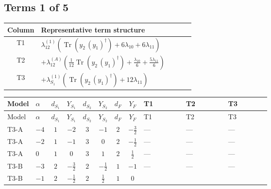 \documentclass[8pt]{article}
\begin{document}
\begin{landscape}
\subsection*{Terms 1 of 5}
\begin{center}
\begin{tabular}{@{}c >{\raggedright\arraybackslash}p{0.82\linewidth}@{}}
\toprule
Column & Representative term structure \\
\midrule
T1 & \(\displaystyle {\lambda_{12}^{(1)}} (\operatorname{Tr}\!\left({y_2}\,\left({y_1}\right)^{\dagger}\right)+6 {\lambda_{10}}+6 {\lambda_{11}})\) \\
\midrule
T2 & \(\displaystyle +{\lambda_{12}^{(A)}} \left(\frac{1}{12} \operatorname{Tr}\!\left({y_2}\,\left({y_1}\right)^{\dagger}\right)+\frac{{\lambda_{10}}}{6}+\frac{5 {\lambda_{11}}}{6}\right)\) \\
\midrule
T3 & \(\displaystyle +{\lambda_{S_1}^{(1)}} (\operatorname{Tr}\!\left({y_2}\,\left({y_1}\right)^{\dagger}\right)+12 {\lambda_{11}})\) \\
\midrule
\bottomrule
\end{tabular}
\end{center}
\smallskip
\tiny
\begin{longtable}{@{}llcccccc >{\raggedright\arraybackslash}p{0.21\linewidth} >{\raggedright\arraybackslash}p{0.21\linewidth} >{\raggedright\arraybackslash}p{0.21\linewidth}@{}}
\toprule
Model & $\alpha$ & $d_{S_1}$ & $Y_{S_1}$ & $d_{S_2}$ & $Y_{S_2}$ & $d_F$ & $Y_F$ & T1 & T2 & T3 \\
\midrule
\endfirsthead
\toprule
Model & $\alpha$ & $d_{S_1}$ & $Y_{S_1}$ & $d_{S_2}$ & $Y_{S_2}$ & $d_F$ & $Y_F$ & T1 & T2 & T3 \\
\midrule
\endhead
T3-A & $-4$ & $1$ & $-2$ & $3$ & $-1$ & $2$ & $-\frac{3}{2}$ & --- & --- & --- \\
\midrule
T3-A & $-2$ & $1$ & $-1$ & $3$ & $0$ & $2$ & $-\frac{1}{2}$ & --- & --- & --- \\
\midrule
T3-A & $0$ & $1$ & $0$ & $3$ & $1$ & $2$ & $\frac{1}{2}$ & --- & --- & --- \\
\midrule
T3-B & $-3$ & $2$ & $-\frac{3}{2}$ & $2$ & $-\frac{1}{2}$ & $1$ & $-1$ & --- & --- & --- \\
\midrule
T3-B & $-1$ & $2$ & $-\frac{1}{2}$ & $2$ & $\frac{1}{2}$ & $1$ & $0$ & \scriptsize\adjustbox{max width=\linewidth}{$\begin{gathered} {\lambda_{12}^{(1)}} (\operatorname{Tr}\!\left({y_2}\,\left({y_1}\right)^{\dagger}\right)+6 {\lambda_{10}}+6 {\lambda_{11}})\end{gathered}$} & \scriptsize\adjustbox{max width=\linewidth}{$\begin{gathered} +{\lambda_{12}^{(A)}} \left(\frac{1}{12} \operatorname{Tr}\!\left({y_2}\,\left({y_1}\right)^{\dagger}\right)+\frac{{\lambda_{10}}}{6}+\frac{5 {\lambda_{11}}}{6}\right)\end{gathered}$} & \scriptsize\adjustbox{max width=\linewidth}{$\begin{gathered} +{\lambda_{S_1}^{(1)}} (\operatorname{Tr}\!\left({y_2}\,\left({y_1}\right)^{\dagger}\right)+12 {\lambda_{11}})\end{gathered}$} \\

\end{longtable}
\end{landscape}
\end{document}
